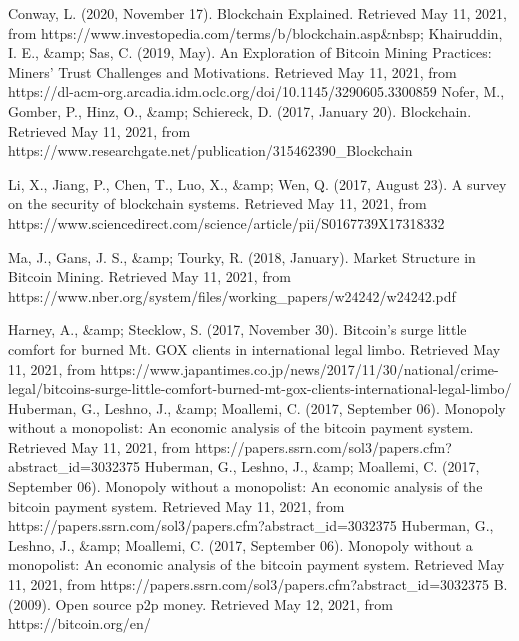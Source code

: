 \documentclass[letterpaper, 10 pt, conference]{ieeeconf}  %
\begin{document}
\begin{thebibliography}{99}

 Conway, L. (2020, November 17). Blockchain Explained. Retrieved May 11, 2021, from https://www.investopedia.com/terms/b/blockchain.asp\&nbsp;
Khairuddin, I. E., \&amp; Sas, C. (2019, May). An Exploration of Bitcoin Mining Practices: Miners' Trust Challenges and Motivations. Retrieved May 11, 2021, from https://dl-acm-org.arcadia.idm.oclc.org/doi/10.1145/3290605.3300859
 Nofer, M., Gomber, P., Hinz, O., \&amp; Schiereck, D. (2017, January 20). Blockchain. Retrieved May 11, 2021, from https://www.researchgate.net/publication/315462390\_Blockchain


Li, X., Jiang, P., Chen, T., Luo, X., \&amp; Wen, Q. (2017, August 23). A survey on the security of blockchain systems. Retrieved May 11, 2021, from https://www.sciencedirect.com/science/article/pii/S0167739X17318332

 Ma, J., Gans, J. S., \&amp; Tourky, R. (2018, January). Market Structure in Bitcoin Mining. Retrieved May 11, 2021, from https://www.nber.org/system/files/working\_papers/w24242/w24242.pdf

 Harney, A., \&amp; Stecklow, S. (2017, November 30). Bitcoin's surge little comfort for burned Mt. GOX clients in international legal limbo. Retrieved May 11, 2021, from https://www.japantimes.co.jp/news/2017/11/30/national/crime-legal/bitcoins-surge-little-comfort-burned-mt-gox-clients-international-legal-limbo/
 Huberman, G., Leshno, J., \&amp; Moallemi, C. (2017, September 06). Monopoly without a monopolist: An economic analysis of the bitcoin payment system. Retrieved May 11, 2021, from https://papers.ssrn.com/sol3/papers.cfm?abstract\_id=3032375
 Huberman, G., Leshno, J., \&amp; Moallemi, C. (2017, September 06). Monopoly without a monopolist: An economic analysis of the bitcoin payment system. Retrieved May 11, 2021, from https://papers.ssrn.com/sol3/papers.cfm?abstract\_id=3032375
 Huberman, G., Leshno, J., \&amp; Moallemi, C. (2017, September 06). Monopoly without a monopolist: An economic analysis of the bitcoin payment system. Retrieved May 11, 2021, from https://papers.ssrn.com/sol3/papers.cfm?abstract\_id=3032375
 B. (2009). Open source p2p money. Retrieved May 12, 2021, from https://bitcoin.org/en/



\end{thebibliography}
\end{document}
